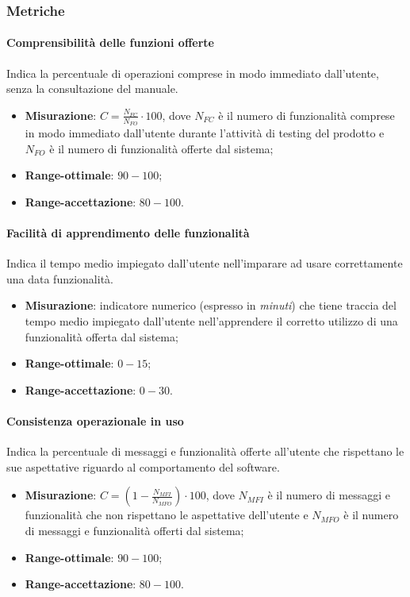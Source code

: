 \subsubsection{Metriche}
\paragraph{Comprensibilità delle funzioni offerte}
Indica la percentuale di operazioni comprese in modo immediato dall'utente, senza la consultazione del manuale.
\begin{itemize}
\item \textbf{Misurazione}: $C=\frac{N_{FC}}{N_{FO}} \cdot 100$, dove $N_{FC}$ è il numero di funzionalità comprese in modo immediato dall'utente durante l'attività di testing del prodotto e $N_{FO}$ è il numero di funzionalità offerte dal sistema;
\item \textbf{Range-ottimale}: $90 - 100$;
\item \textbf{Range-accettazione}: $80 - 100$.
\end{itemize}
\paragraph{Facilità di apprendimento delle funzionalità}
Indica il tempo medio impiegato dall'utente nell'imparare ad usare correttamente una data funzionalità.
\begin{itemize}
\item \textbf{Misurazione}: indicatore numerico (espresso in \textit{minuti}) che tiene traccia del tempo medio impiegato dall'utente nell'apprendere il corretto utilizzo di una funzionalità offerta dal sistema;
\item \textbf{Range-ottimale}: $0 - 15$;
\item \textbf{Range-accettazione}: $0 - 30$.
\end{itemize}
\paragraph{Consistenza operazionale in uso}
Indica la percentuale di messaggi e funzionalità offerte all'utente che rispettano le sue aspettative riguardo al comportamento del software.
\begin{itemize}
\item \textbf{Misurazione}: $C=(1-\frac{N_{MFI}}{N_{MFO}}) \cdot 100$, dove $N_{MFI}$ è il numero di messaggi e funzionalità che non rispettano le aspettative dell'utente e $N_{MFO}$ è il numero di messaggi e funzionalità offerti dal sistema;
\item \textbf{Range-ottimale}: $90 - 100$;
\item \textbf{Range-accettazione}: $80 - 100$.
\end{itemize}
